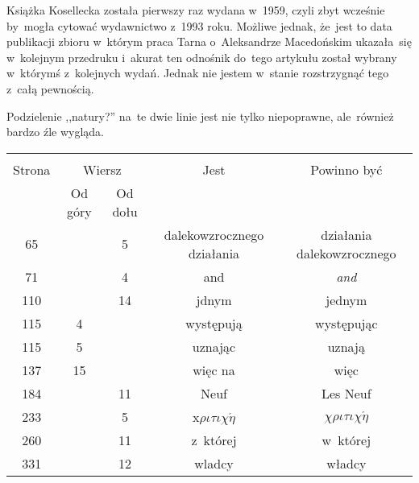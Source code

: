 \documentclass[a4paper,11pt]{article}
\begin{document}
\vspace{\spaceFour}


\start {} Książka Kosellecka została pierwszy raz wydana
w~1959, czyli zbyt wcześnie by~mogła cytować wydawnictwo z~1993 roku.
Możliwe jednak, że~jest to data publikacji zbioru w~którym praca Tarna
o~Aleksandrze Macedońskim ukazała~się w~kolejnym przedruku i~akurat
ten odnośnik do~tego artykułu został wybrany w~którymś z~kolejnych
wydań. Jednak nie jestem w~stanie rozstrzygnąć tego z~całą pewnością.

\vspace{\spaceFour}


\start {} Podzielenie ,,natury?'' na~te dwie linie
jest nie tylko niepoprawne, ale~również bardzo źle wygląda.

\vspace{\spaceFour}

\begin{center}
  \begin{tabular}{|c|c|c|c|c|}
    \hline
    & \multicolumn{2}{c|}{} & & \\
    Strona & \multicolumn{2}{c|}{Wiersz} & Jest
                              & Powinno być \\ \cline{2-3}
    & Od góry & Od dołu & & \\
    \hline
    65  & &  5 & dalekowzrocznego działania & działania dalekowzrocznego \\
    71  & &  4 & and & \emph{and} \\
    110 & & 14 & jdnym & jednym \\
    115 &  4 & & występują & występując \\
    115 &  5 & & uznając & uznają \\
    137 & 15 & & więc na & więc \\
    184 & & 11 & Neuf & Les Neuf \\
    233 & &  5 & x$\rho\iota\tau\iota\chi\acute{\eta}$
           & $\chi\rho\iota\tau\iota\chi\acute{\eta}$ \\
    260 & & 11 & z~której & w~której \\
    331 & & 12 & wladcy & władcy \\
    \hline
  \end{tabular}
\end{center}
\end{document}
